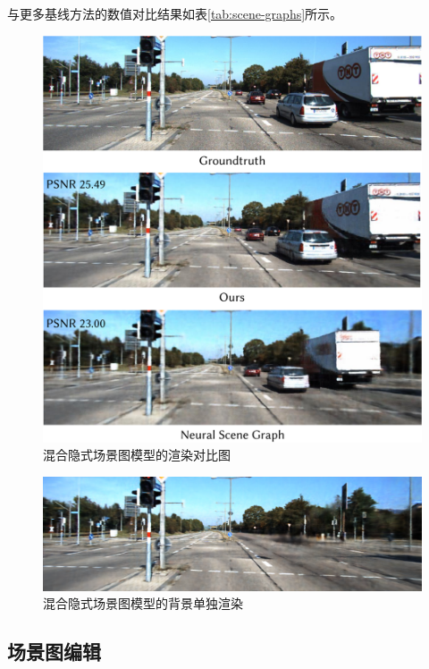 与更多基线方法的数值对比结果如表\ref{tab:scene-graphs}所示。

\begin{figure}[ht]
    \centering
    \includegraphics[width=\textwidth]{undergraduate-thesis/images/experiments/scene-graph rgb qualitative.pdf}
    \caption{混合隐式场景图模型的渲染对比图}
    \label{fig:scene-graph rgb render}
\end{figure}

\begin{figure}[ht]
    \centering
    \includegraphics[width=\textwidth]{undergraduate-thesis/images/experiments/scene-graph background.png}
    \caption{混合隐式场景图模型的背景单独渲染}
    \label{fig:scene-graph background}
\end{figure}

\subsection{场景图编辑}

